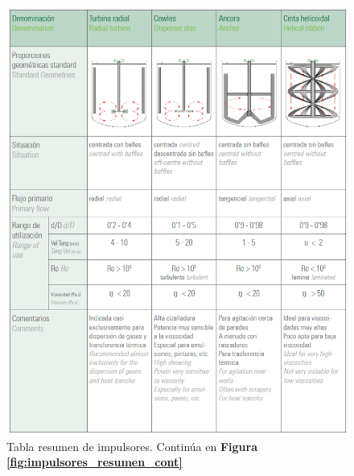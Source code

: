             \begin{figure}
                \centering
                \includegraphics[width=\textwidth]{img/esquemas/resumen_impulsores_cont.png}
                \caption[Tabla resumen de impulsores]{Tabla resumen de impulsores. Continúa en \textbf{Figura \ref{fig:impulsores_resumen_cont}}}
                \label{fig:impulsores_resumen}
            \end{figure}
            
